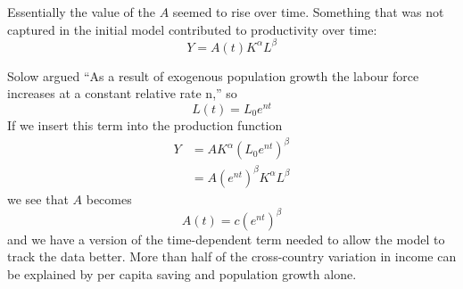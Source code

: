 Essentially the value of the $A$ seemed to rise over time. Something that was not captured in the initial model  contributed to productivity over time: 
 \[Y=A(t)K^\alpha L^\beta\]

Solow argued ``As a result of exogenous population growth the labour force increases at a constant relative rate n,'' so
  \[L(t)= L_0e^{nt}\] 
If we insert this term into the production function 
\begin{eqnarray}
Y &= AK^\alpha (L_0e^{nt})^\beta\nonumber\\
  &= A(e^{nt})^{\beta}K^\alpha L^\beta
\label{eqn-solow-swan3}
\end{eqnarray}
we see that $A$ becomes
 \[A(t)=c(e^{nt})^\beta\]
and we have a version of the time-dependent term needed to  allow the model to track the data better. More than half  of the cross-country variation in income can be explained by per capita saving and population growth alone.



